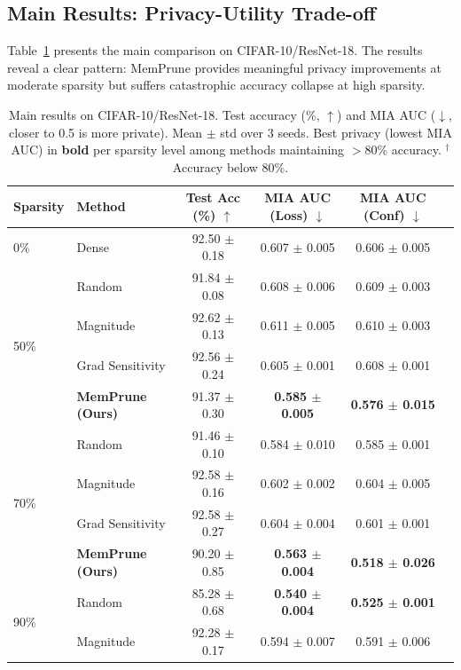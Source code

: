 \documentclass{article}
\begin{document}
\subsection{Main Results: Privacy-Utility Trade-off}

Table~\ref{tab:main} presents the main comparison on CIFAR-10/ResNet-18. The results reveal a clear pattern: MemPrune provides meaningful privacy improvements at moderate sparsity but suffers catastrophic accuracy collapse at high sparsity.

\begin{table}[t]
\caption{Main results on CIFAR-10/ResNet-18. Test accuracy (\%, $\uparrow$) and MIA AUC ($\downarrow$, closer to 0.5 is more private). Mean $\pm$ std over 3 seeds. Best privacy (lowest MIA AUC) in \textbf{bold} per sparsity level among methods maintaining $>$80\% accuracy. $^\dagger$Accuracy below 80\%.}
\label{tab:main}
\centering
\small
\begin{tabular}{llcccc}
\toprule
Sparsity & Method & Test Acc (\%) $\uparrow$ & MIA AUC (Loss) $\downarrow$ & MIA AUC (Conf) $\downarrow$ \\
\midrule
0\% & Dense & 92.50 $\pm$ 0.18 & 0.607 $\pm$ 0.005 & 0.606 $\pm$ 0.005 \\
\midrule
\multirow{4}{*}{50\%} & Random & 91.84 $\pm$ 0.08 & 0.608 $\pm$ 0.006 & 0.609 $\pm$ 0.003 \\
& Magnitude & 92.62 $\pm$ 0.13 & 0.611 $\pm$ 0.005 & 0.610 $\pm$ 0.003 \\
& Grad Sensitivity & 92.56 $\pm$ 0.24 & 0.605 $\pm$ 0.001 & 0.608 $\pm$ 0.001 \\
& \textbf{MemPrune (Ours)} & 91.37 $\pm$ 0.30 & \textbf{0.585 $\pm$ 0.005} & \textbf{0.576 $\pm$ 0.015} \\
\midrule
\multirow{4}{*}{70\%} & Random & 91.46 $\pm$ 0.10 & 0.584 $\pm$ 0.010 & 0.585 $\pm$ 0.001 \\
& Magnitude & 92.58 $\pm$ 0.16 & 0.602 $\pm$ 0.002 & 0.604 $\pm$ 0.005 \\
& Grad Sensitivity & 92.58 $\pm$ 0.27 & 0.604 $\pm$ 0.004 & 0.601 $\pm$ 0.001 \\
& \textbf{MemPrune (Ours)} & 90.20 $\pm$ 0.85 & \textbf{0.563 $\pm$ 0.004} & \textbf{0.518 $\pm$ 0.026} \\
\midrule
\multirow{4}{*}{90\%} & Random & 85.28 $\pm$ 0.68 & \textbf{0.540 $\pm$ 0.004} & \textbf{0.525 $\pm$ 0.001} \\
& Magnitude & 92.28 $\pm$ 0.17 & 0.594 $\pm$ 0.007 & 0.591 $\pm$ 0.006 \\

\end{tabular}
\end{table}
\end{document}
